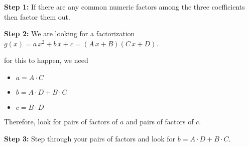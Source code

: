\documentclass{ximera}
\begin{document}
\textbf{\textcolor{blue!75!black}{Step 1:}} If there are any common numeric factors among the three coefficients then factor them out.


\textbf{\textcolor{blue!75!black}{Step 2:}} We are looking for a factorization $g(x) = a \, x^2 + b \, x + c = (A \, x + B)(C \, x + D)$.

for this to happen, we need

\begin{itemize}
\item $a = A \cdot C $
\item $b = A\cdot D + B \cdot C$
\item $c = B \cdot D$
\end{itemize}

Therefore, look for pairs of factors of $a$ and pairs of factors of $c$.






\textbf{\textcolor{blue!75!black}{Step 3:}} Step through your pairs of factors and look for $b = A \cdot D + B \cdot C$.
\end{document}
